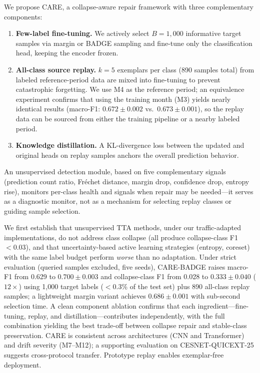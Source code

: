 \documentclass[journal]{IEEEtran}
\newcommand{\ours}{CARE}  %
\begin{document}
We propose \ours{}, a collapse-aware repair framework with three complementary components:
\begin{enumerate}
  \item \textbf{Few-label fine-tuning.} We actively select $B{=}1{,}000$ informative target samples via margin or BADGE sampling and fine-tune only the classification head, keeping the encoder frozen.
  \item \textbf{All-class source replay.} $k{=}5$ exemplars per class (890 samples total) from labeled reference-period data are mixed into fine-tuning to prevent catastrophic forgetting. We use M4 as the reference period; an equivalence experiment confirms that using the training month (M3) yields nearly identical results (macro-F1: $0.672{\pm}0.002$ vs.\ $0.673{\pm}0.001$), so the replay data can be sourced from either the training pipeline or a nearby labeled period.
  \item \textbf{Knowledge distillation.} A KL-divergence loss between the updated and original heads on replay samples anchors the overall prediction behavior.
\end{enumerate}
An unsupervised detection module, based on five complementary signals (prediction count ratio, Fr\'{e}chet distance, margin drop, confidence drop, entropy rise), monitors per-class health and signals when repair may be needed---it serves as a diagnostic monitor, not as a mechanism for selecting replay classes or guiding sample selection.

We first establish that unsupervised TTA methods, under our traffic-adapted implementations, do not address class collapse (all produce collapse-class F1 ${<}0.03$), and that uncertainty-based active learning strategies (entropy, coreset) with the same label budget perform \textit{worse} than no adaptation.
Under strict evaluation (queried samples excluded, five seeds), \ours{}-BADGE raises macro-F1 from 0.629 to $0.700{\pm}0.003$ and collapse-class F1 from 0.028 to $0.333{\pm}0.040$ ($12{\times}$) using 1{,}000 target labels ($<$0.3\% of the test set) plus 890 all-class replay samples; a lightweight margin variant achieves $0.686{\pm}0.001$ with sub-second selection time.
A clean component ablation confirms that each ingredient---fine-tuning, replay, and distillation---contributes independently, with the full combination yielding the best trade-off between collapse repair and stable-class preservation.
\ours{} is consistent across architectures (CNN and Transformer) and drift severity (M7--M12); a supporting evaluation on CESNET-QUICEXT-25 suggests cross-protocol transfer. Prototype replay enables exemplar-free deployment.
\end{document}
